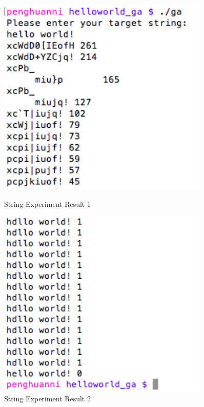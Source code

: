 \documentclass{article}
\begin{document}
\begin{figure}[h]
    \centering
    \begin{minipage}{0.45\textwidth}
        \centering
        \includegraphics[width=0.9\textwidth]{hello1} %
        \caption{String Experiment Result 1}
    \end{minipage}\hfill
    \begin{minipage}{0.45\textwidth}
        \centering
        \includegraphics[width=0.9\textwidth]{hello2} %
        \caption{String Experiment Result 2}
    \end{minipage}
\end{figure}
\end{document}

